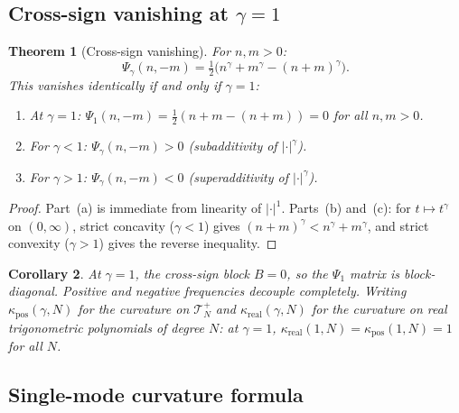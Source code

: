 \documentclass[11pt,a4paper]{article}
\theoremstyle{plain}
\newtheorem{theorem}{Theorem}[section]
\newtheorem{corollary}[theorem]{Corollary}
\theoremstyle{definition}
\theoremstyle{remark}
\begin{document}
\subsection{Cross-sign vanishing at $\gamma = 1$}\label{sec:cross-sign}

\begin{theorem}[Cross-sign vanishing]\label{thm:cross-sign}
For $n,m > 0$:
\begin{equation}\label{eq:cross-sign}
  \Psi_\gamma(n,-m) = \tfrac{1}{2}\bigl(n^\gamma + m^\gamma
  - (n+m)^\gamma\bigr).
\end{equation}
This vanishes identically if and only if $\gamma = 1$:
\begin{enumerate}[label=(\alph*)]
\item At $\gamma = 1$: $\Psi_1(n,-m)
  = \tfrac{1}{2}(n + m - (n+m)) = 0$ for all $n,m > 0$.
\item For $\gamma < 1$: $\Psi_\gamma(n,-m) > 0$
  (subadditivity of $|\cdot|^\gamma$).
\item For $\gamma > 1$: $\Psi_\gamma(n,-m) < 0$
  (superadditivity of $|\cdot|^\gamma$).
\end{enumerate}
\end{theorem}

\begin{proof}
Part~(a) is immediate from linearity of $|\cdot|^1$.
Parts~(b) and~(c): for $t \mapsto t^\gamma$ on $(0,\infty)$,
strict concavity ($\gamma < 1$) gives
$(n+m)^\gamma < n^\gamma + m^\gamma$, and strict convexity
($\gamma > 1$) gives the reverse inequality.
\end{proof}

\begin{corollary}\label{cor:block-diag}
At $\gamma = 1$, the cross-sign block $B = 0$, so the $\Psi_1$
matrix is block-diagonal. Positive and negative frequencies
decouple completely.
Writing $\kappa_{\mathrm{pos}}(\gamma,N)$ for the curvature
on $\mathcal{T}_N^+$ and $\kappa_{\mathrm{real}}(\gamma,N)$
for the curvature on real trigonometric polynomials of degree $N$:
at $\gamma = 1$, $\kappa_{\mathrm{real}}(1,N)
= \kappa_{\mathrm{pos}}(1,N) = 1$ for all $N$.
\end{corollary}


\subsection{Single-mode curvature formula}
\end{document}
